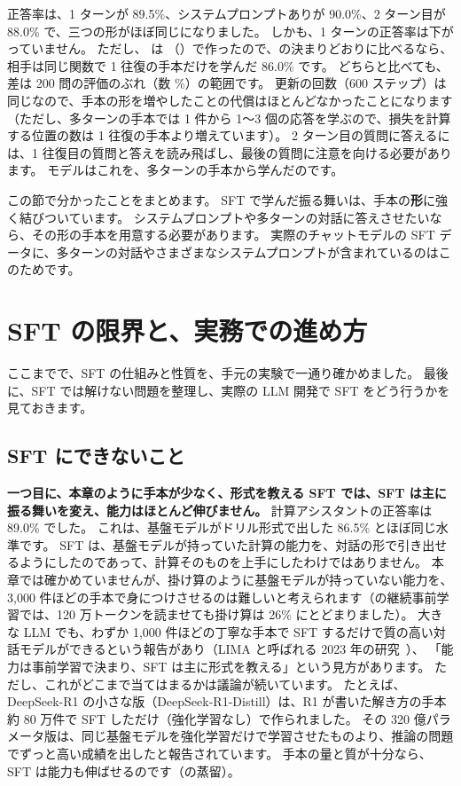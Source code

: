 正答率は、1 ターンが 89.5\%、システムプロンプトありが 90.0\%、2 ターン目が 88.0\% で、三つの形がほぼ同じになりました。
しかも、1 ターンの正答率は下がっていません。
ただし、 は （）で作ったので、の決まりどおりに比べるなら、相手は同じ関数で 1 往復の手本だけを学んだ 86.0\% です。
どちらと比べても、差は 200 問の評価のぶれ（数 \%）の範囲です。
更新の回数（600 ステップ）は同じなので、手本の形を増やしたことの代償はほとんどなかったことになります
（ただし、多ターンの手本では 1 件から 1〜3 個の応答を学ぶので、損失を計算する位置の数は 1 往復の手本より増えています）。
2 ターン目の質問に答えるには、1 往復目の質問と答えを読み飛ばし、最後の質問に注意を向ける必要があります。
モデルはこれを、多ターンの手本から学んだのです。

この節で分かったことをまとめます。
SFT で学んだ振る舞いは、手本の\textbf{形}に強く結びついています。
システムプロンプトや多ターンの対話に答えさせたいなら、その形の手本を用意する必要があります。
実際のチャットモデルの SFT データに、多ターンの対話やさまざまなシステムプロンプトが含まれているのはこのためです\cite{touvron2023llama2}。


\section{SFT の限界と、実務での進め方}\label{sec:post-practice}

ここまでで、SFT の仕組みと性質を、手元の実験で一通り確かめました。
最後に、SFT では解けない問題を整理し、実際の LLM 開発で SFT をどう行うかを見ておきます。

\subsection{SFT にできないこと}\label{sec:post-limits}

\textbf{一つ目に、本章のように手本が少なく、形式を教える SFT では、SFT は主に振る舞いを変え、能力はほとんど伸びません。}
計算アシスタントの正答率は 89.0\% でした。
これは、基盤モデルがドリル形式で出した 86.5\% とほぼ同じ水準です。
SFT は、基盤モデルが持っていた計算の能力を、対話の形で引き出せるようにしたのであって、計算そのものを上手にしたわけではありません。
本章では確かめていませんが、掛け算のように基盤モデルが持っていない能力を、3,000 件ほどの手本で身につけさせるのは難しいと考えられます（の継続事前学習では、120 万トークンを読ませても掛け算は 26\% にとどまりました）。
大きな LLM でも、わずか 1,000 件ほどの丁寧な手本で SFT するだけで質の高い対話モデルができるという報告があり（LIMA と呼ばれる 2023 年の研究~\cite{zhou2023lima}）、
「能力は事前学習で決まり、SFT は主に形式を教える」という見方があります。
ただし、これがどこまで当てはまるかは議論が続いています。
たとえば、DeepSeek-R1 の小さな版（DeepSeek-R1-Distill）は、R1 が書いた解き方の手本約 80 万件で SFT しただけ（強化学習なし）で作られました。
その 320 億パラメータ版は、同じ基盤モデルを強化学習だけで学習させたものより、推論の問題でずっと高い成績を出したと報告されています\cite{guo2025deepseekr1}。
手本の量と質が十分なら、SFT は能力も伸ばせるのです（の蒸留）。

